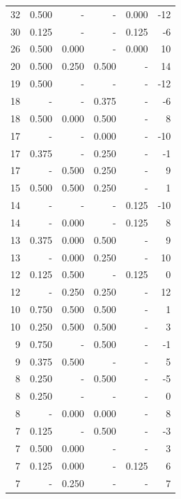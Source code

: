\documentclass[a4paper]{article}\usepackage{graphicx, color}
\begin{document}
\begin{table}[ht]
\begin{tabular}{rrrrrr}
   \rowcolor{nullColor} 32 & 0.500 & - & - & 0.000 & -12 \\ 
   \rowcolor{nullColor} 30 & 0.125 & - & - & 0.125 & -6 \\ 
  26 & 0.500 & 0.000 & - & 0.000 & 10 \\ 
   \rowcolor{badColor} 20 & 0.500 & 0.250 & 0.500 & - & 14 \\ 
   \rowcolor{nullColor} 19 & 0.500 & - & - & - & -12 \\ 
   \rowcolor{sosoColor} 18 & - & - & 0.375 & - & -6 \\ 
   \rowcolor{badColor} 18 & 0.500 & 0.000 & 0.500 & - & 8 \\ 
   \rowcolor{sosoColor} 17 & - & - & 0.000 & - & -10 \\ 
   \rowcolor{sosoColor} 17 & 0.375 & - & 0.250 & - & -1 \\ 
   \rowcolor{badColor} 17 & - & 0.500 & 0.250 & - & 9 \\ 
   \rowcolor{badColor} 15 & 0.500 & 0.500 & 0.250 & - & 1 \\ 
   \rowcolor{nullColor} 14 & - & - & - & 0.125 & -10 \\ 
  14 & - & 0.000 & - & 0.125 & 8 \\ 
   \rowcolor{badColor} 13 & 0.375 & 0.000 & 0.500 & - & 9 \\ 
   \rowcolor{badColor} 13 & - & 0.000 & 0.250 & - & 10 \\ 
  12 & 0.125 & 0.500 & - & 0.125 & 0 \\ 
   \rowcolor{goodColor} 12 & - & 0.250 & 0.250 & - & 12 \\ 
   \rowcolor{goodColor} 10 & 0.750 & 0.500 & 0.500 & - & 1 \\ 
   \rowcolor{goodColor} 10 & 0.250 & 0.500 & 0.500 & - & 3 \\ 
   \rowcolor{sosoColor} 9 & 0.750 & - & 0.500 & - & -1 \\ 
  9 & 0.375 & 0.500 & - & - & 5 \\ 
   \rowcolor{sosoColor} 8 & 0.250 & - & 0.500 & - & -5 \\ 
   \rowcolor{nullColor} 8 & 0.250 & - & - & - & 0 \\ 
   \rowcolor{goodColor} 8 & - & 0.000 & 0.000 & - & 8 \\ 
   \rowcolor{sosoColor} 7 & 0.125 & - & 0.500 & - & -3 \\ 
  7 & 0.500 & 0.000 & - & - & 3 \\ 
  7 & 0.125 & 0.000 & - & 0.125 & 6 \\ 
  7 & - & 0.250 & - & - & 7 \\ 

\end{tabular}
\end{table}
\end{document}
